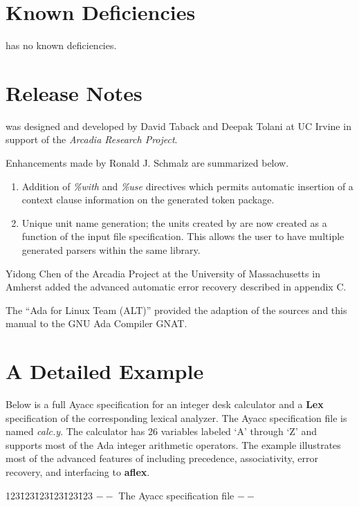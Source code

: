 \section{Known Deficiencies}
\ayacc has no known deficiencies.
\section{Release Notes}
\ayacc was designed and developed by David Taback and Deepak Tolani at
UC Irvine in support of the {\it Arcadia Research Project}.

Enhancements made by Ronald J. Schmalz are summarized below.
\begin{enumerate}
\item Addition of {\it \%with} and {\it \%use} directives which
permits automatic insertion of a context clause information on the
generated token package. 

\item Unique unit name generation; the units created by \ayacc are now
created as a function of the input file specification.  This allows
the user to have multiple \ayacc generated parsers within the same
library.
\end{enumerate}

Yidong Chen of the Arcadia Project at the University of Massachusetts
in Amherst added the advanced automatic error recovery described in
appendix C.


The ``Ada for Linux Team (ALT)'' provided the adaption of the sources
and this manual to the GNU Ada Compiler GNAT.

\newpage
\appendix
\section{A Detailed Example}
Below is a full Ayacc specification for an integer desk calculator and
a {\bf Lex} specification of the corresponding lexical analyzer.  The Ayacc
specification file is named {\it calc.y}.  The calculator
has 26 variables labeled `A' through `Z' and supports most of the Ada
integer arithmetic operators.  The example illustrates most of the
advanced features of \ayacc including precedence, associativity,
error recovery, and interfacing to {\bf aflex}.

\begin{tabbing}
123\=123\=123\=123\=123\=123 \kill
\>\>\>\>                 $--$ The Ayacc specification file  $--$\\
\end{tabbing}

